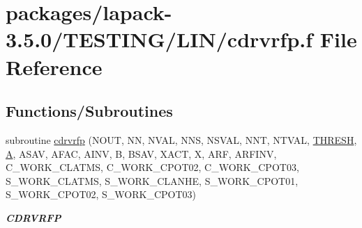 \hypertarget{cdrvrfp_8f}{}\section{packages/lapack-\/3.5.0/\+T\+E\+S\+T\+I\+N\+G/\+L\+I\+N/cdrvrfp.f File Reference}
\label{cdrvrfp_8f}
\subsection*{Functions/\+Subroutines}
\begin{DoxyCompactItemize}
\item 
subroutine \hyperlink{group__complex__lin_ga4249d3b2884c1689f4c8db5a97996f40}{cdrvrfp} (N\+O\+U\+T, N\+N, N\+V\+A\+L, N\+N\+S, N\+S\+V\+A\+L, N\+N\+T, N\+T\+V\+A\+L, \hyperlink{zlaqgs_8c_a0656018abfc9fa2821827415f5d5ea57}{T\+H\+R\+E\+S\+H}, \hyperlink{classA}{A}, A\+S\+A\+V, A\+F\+A\+C, A\+I\+N\+V, B, B\+S\+A\+V, X\+A\+C\+T, X, A\+R\+F, A\+R\+F\+I\+N\+V, C\+\_\+\+W\+O\+R\+K\+\_\+\+C\+L\+A\+T\+M\+S, C\+\_\+\+W\+O\+R\+K\+\_\+\+C\+P\+O\+T02, C\+\_\+\+W\+O\+R\+K\+\_\+\+C\+P\+O\+T03, S\+\_\+\+W\+O\+R\+K\+\_\+\+C\+L\+A\+T\+M\+S, S\+\_\+\+W\+O\+R\+K\+\_\+\+C\+L\+A\+N\+H\+E, S\+\_\+\+W\+O\+R\+K\+\_\+\+C\+P\+O\+T01, S\+\_\+\+W\+O\+R\+K\+\_\+\+C\+P\+O\+T02, S\+\_\+\+W\+O\+R\+K\+\_\+\+C\+P\+O\+T03)
\begin{DoxyCompactList}\small\item\em {\bfseries C\+D\+R\+V\+R\+F\+P} \end{DoxyCompactList}\end{DoxyCompactItemize}

